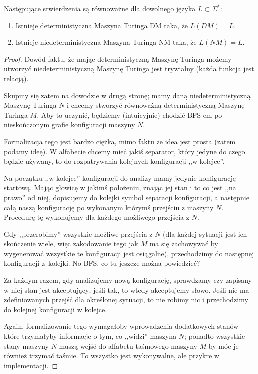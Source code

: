 \begin{theorem}
	Następujące stwierdzenia są równoważne dla dowolnego języka \( L \subset \Sigma^*\):
	\begin{enumerate}
		\item Istnieje deterministyczna Maszyna Turinga DM taka, że \(L(DM) = L\).
		\item Istnieje niedeterministyczna Maszyna Turinga NM taka, że \(L(NM) = L \).
	\end{enumerate}
\end{theorem}

\begin{proof}
	Dowód faktu, że mając deterministyczną Maszynę Turinga możemy utworzyć niedeterministyczną Maszynę Turinga jest trywialny (każda funkcja jest relacją).

	Skupmy się zatem na dowodzie w drugą stronę; mamy daną niedeterministyczną Maszynę Turinga \(N\) i chcemy stworzyć równoważną deterministyczną Maszynę Turinga \(M\). Aby to uczynić, będziemy (intuicyjnie) chodzić BFS-em po nieskończonym grafie konfiguracji maszyny \(N\).

	Formalizacja tego jest bardzo ciężka, mimo faktu że idea jest prosta (zatem podamy ideę). W alfabecie chcemy mieć jakiś separator, który jedyne do czego będzie używany, to do rozpatrywania kolejnych konfiguracji ,,w kolejce''.

	Na początku ,,w kolejce'' konfiguracji do analizy mamy jedynie konfigurację startową. Mając głowicę w jakimś położeniu, znając jej stan i to co jest ,,na prawo'' od niej, dopisujemy do kolejki symbol separacji konfiguracji, a następnie całą naszą konfigurację po wykonanym którymś przejściu z maszyny \(N\). Procedurę tę wykonujemy dla każdego możliwego przejścia z \(N\).

	Gdy ,,przerobimy'' wszystkie możliwe przejścia z \(N\) (dla każdej sytuacji jest ich skończenie wiele, więc zakodowanie tego jak \(M\) ma się zachowywać by wygenerować wszystkie te konfiguracji jest osiągalne), przechodzimy do następnej konfiguracji z~kolejki. No BFS, co tu jeszcze można powiedzieć?

	Za każdym razem, gdy analizujemy nową konfigurację, sprawdzamy czy zapisany w niej stan jest akceptujący; jeśli tak, to wtedy akceptujemy słowo. Jeśli nie ma zdefiniowanych przejść dla określonej sytuacji, to nie robimy nic i przechodzimy do kolejnej konfiguracji w kolejce.

	Again, formalizowanie tego wymagałoby wprowadzenia dodatkowych stanów które trzymałyby informacje o tym, co ,,widzi'' maszyna \(N\); ponadto wszystkie stany maszyny \(N\) muszą wejść do alfabetu taśmowego maszyny \(M\) by móc je również trzymać taśmie. To wszystko jest wykonywalne, ale przykre w implementacji.
\end{proof}
